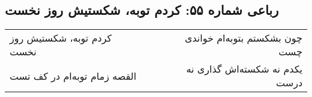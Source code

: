 \begin{center}
\section*{رباعی شماره ۵۵: کردم توبه، شکستیش روز نخست}
\label{sec:sh055}
\begin{longtable}{l p{0.5cm} r}
کردم توبه، شکستیش روز نخست
&&
چون بشکستم بتوبه‌ام خواندی چست
\\
القصه زمام توبه‌ام در کف تست
&&
یکدم نه شکسته‌اش گذاری نه درست
\\
\end{longtable}
\end{center}
